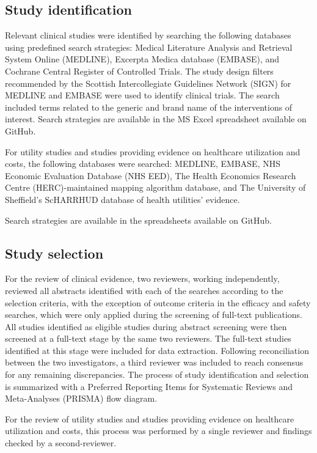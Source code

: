 \documentclass[11pt,final,fleqn]{article}\usepackage[]{graphicx}\usepackage[]{color}
\theoremstyle{plain}
\begin{document}
\begin{appendices}
\subsection{Study identification}
Relevant clinical studies were identified by searching the following databases using predefined search strategies: Medical Literature Analysis and Retrieval System Online (MEDLINE), Excerpta Medica database (EMBASE), and Cochrane Central Register of Controlled Trials. The study design filters recommended by the Scottish Intercollegiate Guidelines Network (SIGN) for MEDLINE and EMBASE were used to identify clinical trials. The search included terms related to the generic and brand name of the interventions of interest. Search strategies are available in the MS Excel spreadsheet available on GitHub.

For utility studies and studies providing evidence on healthcare utilization and costs, the following databases were searched: MEDLINE, EMBASE, NHS Economic Evaluation Database (NHS EED), The Health Economics Research Centre (HERC)-maintained mapping algorithm database, and The University of Sheffield's ScHARRHUD database of health utilities' evidence.

Search strategies are available in the spreadsheets available on GitHub.

\subsection{Study selection}
For the review of clinical evidence, two reviewers, working independently, reviewed all abstracts identified with each of the searches according to the selection criteria, with the exception of outcome criteria in the efficacy and safety searches, which were only applied during the screening of full-text publications. All studies identified as eligible studies during abstract screening were then screened at a full-text stage by the same two reviewers. The full-text studies identified at this stage were included for data extraction. Following reconciliation between the two investigators, a third reviewer was included to reach consensus for any remaining discrepancies. The process of study identification and selection is summarized with a Preferred Reporting Items for Systematic Reviews and Meta-Analyses (PRISMA) flow diagram. 

For the review of utility studies and studies providing evidence on healthcare utilization and costs, this process was performed by a single reviewer and findings checked by a second-reviewer. 


\end{appendices}
\end{document}
